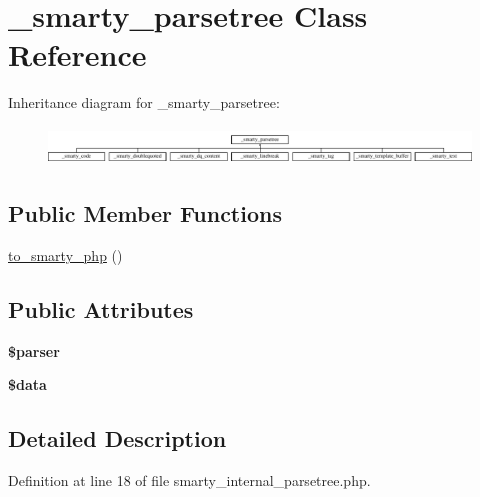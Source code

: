 \hypertarget{class__smarty__parsetree}{\section{\-\_\-smarty\-\_\-parsetree Class Reference}
\label{class__smarty__parsetree}
}
Inheritance diagram for \-\_\-smarty\-\_\-parsetree\-:\begin{figure}[H]
\begin{center}
\leavevmode
\includegraphics[height=1.012658cm]{class__smarty__parsetree}
\end{center}
\end{figure}
\subsection*{Public Member Functions}
\begin{DoxyCompactItemize}
\item 
\hyperlink{class__smarty__parsetree_a0f38ed5d5527ceee7acb60db4b5acf63}{to\-\_\-smarty\-\_\-php} ()
\end{DoxyCompactItemize}
\subsection*{Public Attributes}
\begin{DoxyCompactItemize}
\item 
\hypertarget{class__smarty__parsetree_a46811d6d6a1be762e07d2988db694967}{{\bfseries \$parser}}\label{class__smarty__parsetree_a46811d6d6a1be762e07d2988db694967}

\item 
\hypertarget{class__smarty__parsetree_a4544d06e7e0995ea64a084f4d3eeb84c}{{\bfseries \$data}}\label{class__smarty__parsetree_a4544d06e7e0995ea64a084f4d3eeb84c}

\end{DoxyCompactItemize}


\subsection{Detailed Description}


Definition at line 18 of file smarty\-\_\-internal\-\_\-parsetree.\-php.



